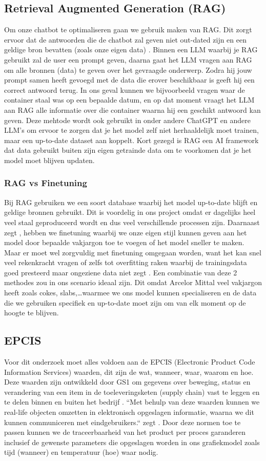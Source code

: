 \subsection{Retrieval Augmented Generation (RAG)}
Om onze chatbot te optimaliseren gaan we gebruik maken van RAG.
Dit zorgt ervoor dat de antwoorden die de chatbot zal geven niet out-dated zijn en een geldige bron bevatten (zoals onze eigen data) \autocite{IBM2023}.
Binnen een LLM waarbij je RAG gebruikt zal de user een prompt geven, daarna gaat het LLM vragen aan RAG om alle bronnen (data) te geven over het gevraagde onderwerp.
Zodra hij jouw prompt samen heeft gevoegd met de data die erover beschikbaar is geeft hij een correct antwoord terug.
In ons geval kunnen we bijvoorbeeld vragen waar de container staal was op een bepaalde datum, en op dat moment vraagt het LLM aan RAG alle informatie over die container waarna hij een geschikt antwoord kan geven.
Deze mehtode wordt ook gebruikt in onder andere ChatGPT en andere LLM's om ervoor te zorgen dat je het model zelf niet herhaaldelijk moet trainen, maar een up-to-date dataset aan koppelt.
Kort gezegd is RAG een AI framework dat data gebruikt buiten zijn eigen getrainde data om te voorkomen dat je het model moet blijven updaten.
\subsubsection{RAG vs Finetuning}
Bij RAG gebruiken we een soort database waarbij het model up-to-date blijft en geldige bronnen gebruikt. Dit is voordelig in ons project omdat er dagelijks heel veel staal geproduceerd wordt en dus veel verschillende processen zijn.
Daarnaast zegt \textcite{IBM2024}, hebben we finetuning waarbij we onze eigen stijl kunnen geven aan het model door bepaalde vakjargon toe te voegen of het model sneller te maken.
Maar er moet wel zorgvuldig met finetuning omgegaan worden, want het kan snel veel rekenkracht vragen of zelfs tot overfitting raken waarbij de trainingsdata goed presteerd maar ongeziene data niet zegt \textcite{EASIIO2022}.
Een combinatie van deze 2 methodes zou in ons scenario ideaal zijn. Dit omdat Arcelor Mittal veel vakjargon heeft zoals cokes, slabs,\dots waarmee we ons model kunnen specialiseren en de data die we gebruiken specifiek en up-to-date moet zijn om van elk moment op de hoogte te blijven.


\subsection{EPCIS}
Voor dit onderzoek moet alles voldoen aan de EPCIS (Electronic Product Code Information Services) waarden, dit zijn de wat, wanneer, waar, waarom en hoe. 
Deze waarden zijn ontwikkeld door GS1 om gegevens over beweging, status en verandering van een item in de toeleveringsketen (supply chain) vast te leggen en te delen binnen en buiten het bedrijf \autocite{Devins}.
``Met behulp van deze waarden kunnen we real-life objecten omzetten in elektronisch opgeslagen informatie, waarna we dit kunnen communiceren met eindgebruikers.`` zegt \textcite{Devins}.
Door deze normen toe te passen kunnen we de traceerbaarheid van het product per proces garanderen inclusief de gewenste parameters die opgeslagen worden in ons grafiekmodel zoals tijd (wanneer) en temperatuur (hoe) waar nodig.

